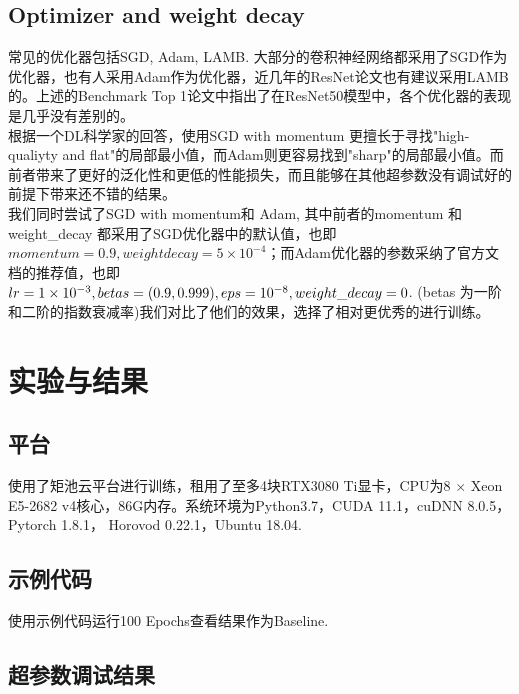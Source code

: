 \documentclass[hyperref, UTF8, 12pt]{article}
\theoremstyle{definition}
\begin{document}
\subsection{Optimizer and weight decay}
常见的优化器包括SGD, Adam, LAMB. 大部分的卷积神经网络都采用了SGD作为优化器，也有人采用Adam作为优化器，近几年的ResNet论文也有建议采用LAMB的。上述的Benchmark Top 1\cite{dosovitskiy2021image}论文中指出了在ResNet50模型中，各个优化器的表现是几乎没有差别的。\\
\indent
根据一个DL科学家的回答\cite{QuoraAnswer}，使用SGD with momentum 更擅长于寻找"high-qualiyty and flat"的局部最小值，而Adam则更容易找到"sharp"的局部最小值。而前者带来了更好的泛化性和更低的性能损失，而且能够在其他超参数没有调试好的前提下带来还不错的结果。\\
\indent
我们同时尝试了SGD with momentum和 Adam, 其中前者的momentum 和weight\_decay 都采用了SGD优化器中的默认值，也即$momentum = 0.9, weight decay = 5 \times 10 ^ {-4}$；而Adam优化器的参数采纳了官方文档的推荐值，也即$lr = 1 \times 10^{-3}, \space betas=(0.9, 0.999), \space eps = 10 ^ {-8}, \space weight\_decay = 0$. (betas 为一阶和二阶的指数衰减率)我们对比了他们的效果，选择了相对更优秀的进行训练。

\section{实验与结果}
\subsection{平台}
使用了矩池云平台进行训练，租用了至多4块RTX3080 Ti显卡，CPU为8 $\times$ Xeon E5-2682 v4核心，86G内存。系统环境为Python3.7，CUDA 11.1，cuDNN 8.0.5，Pytorch 1.8.1， Horovod 0.22.1，Ubuntu 18.04.

\subsection{示例代码}
使用示例代码运行100 Epochs查看结果作为Baseline.

\subsection{超参数调试结果}
\end{document}
